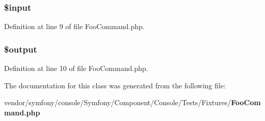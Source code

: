 \subsubsection[{\$input}]{\setlength{\rightskip}{0pt plus 5cm}\$input}\label{class_foo_command_a69b271260be394b90709736cccb22c76}


Definition at line 9 of file Foo\+Command.\+php.

\subsubsection[{\$output}]{\setlength{\rightskip}{0pt plus 5cm}\$output}\label{class_foo_command_a73004ce9cd673c1bfafd1dc351134797}


Definition at line 10 of file Foo\+Command.\+php.



The documentation for this class was generated from the following file\+:\begin{DoxyCompactItemize}
\item 
vendor/symfony/console/\+Symfony/\+Component/\+Console/\+Tests/\+Fixtures/{\bf Foo\+Command.\+php}\end{DoxyCompactItemize}
